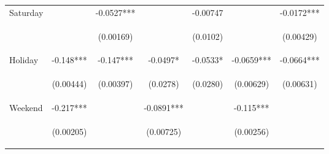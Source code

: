 \begin{center}
\begin{tabular}{lcccccc}
Saturday &  & -0.0527*** &  & -0.00747 &  & -0.0172*** \\
\vspace{4pt} & \begin{footnotesize}\end{footnotesize} & \begin{footnotesize}(0.00169)\end{footnotesize} & \begin{footnotesize}\end{footnotesize} & \begin{footnotesize}(0.0102)\end{footnotesize} & \begin{footnotesize}\end{footnotesize} & \begin{footnotesize}(0.00429)\end{footnotesize} \\
Holiday & -0.148*** & -0.147*** & -0.0497* & -0.0533* & -0.0659*** & -0.0664*** \\
\vspace{4pt} & \begin{footnotesize}(0.00444)\end{footnotesize} & \begin{footnotesize}(0.00397)\end{footnotesize} & \begin{footnotesize}(0.0278)\end{footnotesize} & \begin{footnotesize}(0.0280)\end{footnotesize} & \begin{footnotesize}(0.00629)\end{footnotesize} & \begin{footnotesize}(0.00631)\end{footnotesize} \\
Weekend & -0.217*** &  & -0.0891*** &  & -0.115*** &  \\
 & \begin{footnotesize}(0.00205)\end{footnotesize} & \begin{footnotesize}\end{footnotesize} & \begin{footnotesize}(0.00725)\end{footnotesize} & \begin{footnotesize}\end{footnotesize} & \begin{footnotesize}(0.00256)\end{footnotesize} & \begin{footnotesize}\end{footnotesize} \\

\end{tabular}
\end{center}
